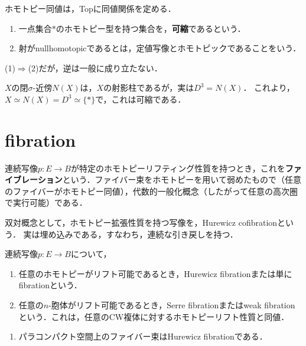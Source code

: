 \documentclass[uplatex, dvipdfmx]{jsreport}
\begin{document}
\begin{lemma}
    ホモトピー同値は，Topに同値関係を定める．
\end{lemma}

\begin{definition}\mbox{}
    \begin{enumerate}
        \item 一点集合$*$のホモトピー型を持つ集合を，\textbf{可縮}であるという．
        \item 射がnullhomotopicであるとは，定値写像とホモトピックであることをいう．
    \end{enumerate}
    (1)$\Rightarrow$(2)だが，逆は一般に成り立たない．
\end{definition}

\begin{example}
    $X$の閉$\sigma$-近傍$N(X)$は，$X$の射影柱であるが，実は$D^3= N(X)$．
    これより，$X\simeq N(X)=D^3\simeq\{*\}$で，これは可縮である．
\end{example}

\section{fibration}

\begin{tcolorbox}[colframe=ForestGreen, colback=ForestGreen!10!white,breakable,colbacktitle=ForestGreen!40!white,coltitle=black,fonttitle=\bfseries\sffamily,
title=]
    連続写像$p:E\to B$が特定のホモトピーリフティング性質を持つとき，これを\textbf{ファイブレーション}という．ファイバー束をホモトピーを用いて弱めたもので（任意のファイバーがホモトピー同値），代数的一般化概念（したがって任意の高次圏で実行可能）である．

    双対概念として，ホモトピー拡張性質を持つ写像を，Hurewicz cofibrationという．
    実は埋め込みである，すなわち，連続な引き戻しを持つ．
\end{tcolorbox}

\begin{definition}
    連続写像$p:E\to B$について，
    \begin{enumerate}
        \item 任意のホモトピーがリフト可能であるとき，Hurewicz fibrationまたは単にfibrationという．
        \item 任意の$n$-胞体がリフト可能であるとき，Serre fibrationまたはweak fibrationという．これは，任意のCW複体に対するホモトピーリフト性質と同値．
    \end{enumerate}
\end{definition}
\begin{example}\mbox{}
    \begin{enumerate}
        \item パラコンパクト空間上のファイバー束はHurewicz fibrationである．
    \end{enumerate}
\end{example}
\end{document}
